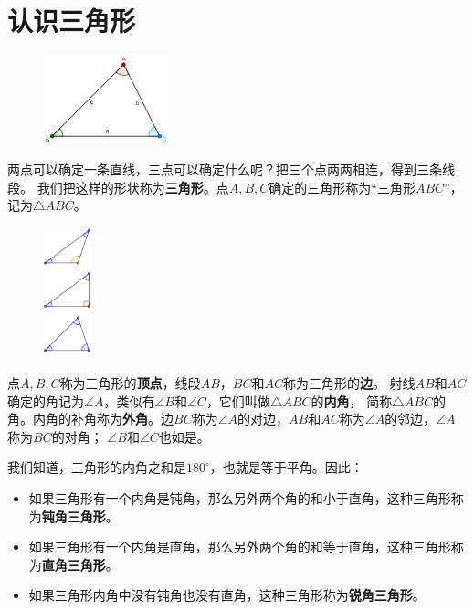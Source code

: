 \documentclass[12pt,UTF8]{ctexbook}
\begin{document}
\section{认识三角形}
\begin{figure} %
    \vspace{-15pt}
    \includegraphics[width=0.32\textwidth]{三角形0.png}
\end{figure}
两点可以确定一条直线，三点可以确定什么呢？把三个点两两相连，得到三条线段。
我们把这样的形状称为\textbf{三角形}。点$A,B,C$确定的三角形称为“三角形$ABC$”，记为$\triangle ABC$。

\begin{figure} %
    \vspace{-10pt}
    \includegraphics[width=0.12\textwidth]{三角形1.png}
\end{figure}

点$A,B,C$称为三角形的\textbf{顶点}，线段$AB$，$BC$和$AC$称为三角形的\textbf{边}。
射线$AB$和$AC$确定的角记为$\angle A$，类似有$\angle B$和$\angle C$，它们叫做$\triangle ABC$的\textbf{内角}，
简称$\triangle ABC$的角。内角的补角称为\textbf{外角}。边$BC$称为$\angle A$的对边，$AB$和$AC$称为$\angle A$的邻边，$\angle A$称为$BC$的对角；
$\angle B$和$\angle C$也如是。

我们知道，三角形的内角之和是$180^\circ$，也就是等于平角。因此：
\begin{itemize}
    \item 如果三角形有一个内角是钝角，那么另外两个角的和小于直角，这种三角形称为\textbf{钝角三角形}。
    \item 如果三角形有一个内角是直角，那么另外两个角的和等于直角，这种三角形称为\textbf{直角三角形}。
    \item 如果三角形内角中没有钝角也没有直角，这种三角形称为\textbf{锐角三角形}。
\end{itemize}
\end{document}
